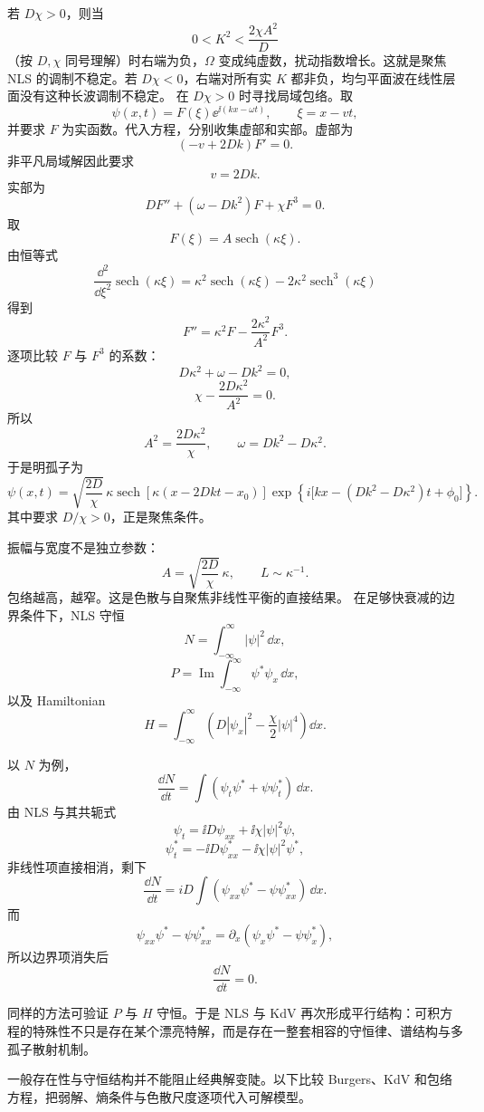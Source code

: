若 $D\chi>0$，则当
\[
0<K^2<\frac{2\chi A^2}{D}
\]
（按 $D,\chi$ 同号理解）时右端为负，$\Omega$ 变成纯虚数，扰动指数增长。这就是聚焦 NLS 的调制不稳定。若 $D\chi<0$，右端对所有实 $K$ 都非负，均匀平面波在线性层面没有这种长波调制不稳定。
在 $D\chi>0$ 时寻找局域包络。取
\[
\psi(x,t)=F(\xi)\ee^{\ii (kx-\omega t)},
\qquad
\xi=x-vt,
\]
并要求 $F$ 为实函数。代入方程，分别收集虚部和实部。虚部为
\[
(-v+2Dk)F'=0.
\]
非平凡局域解因此要求
\begin{equation*}\boxed{v=2Dk}.\end{equation*}
实部为
\[
D F''+(\omega-Dk^2)F+\chi F^3=0.
\]
取
\[
F(\xi)=A\operatorname{sech}(\kappa\xi).
\]
由恒等式
\[
\frac{\dd^2}{\dd\xi^2}\operatorname{sech}(\kappa\xi)
=\kappa^2\operatorname{sech}(\kappa\xi)
-2\kappa^2\operatorname{sech}^3(\kappa\xi)
\]
得到
\[
F''=\kappa^2F-\frac{2\kappa^2}{A^2}F^3.
\]
逐项比较 $F$ 与 $F^3$ 的系数：
\[
D\kappa^2+\omega-Dk^2=0,
\]
\[
\chi-\frac{2D\kappa^2}{A^2}=0.
\]
所以
\[
A^2=\frac{2D\kappa^2}{\chi},
\qquad
\omega=Dk^2-D\kappa^2.
\]
于是明孤子为
\begin{equation*}\boxed{
\psi(x,t)
=\sqrt{\frac{2D}{\chi}}\,\kappa
\operatorname{sech}[\kappa(x-2Dkt-x_0)]
\exp\!\left\{
i\bigl[kx-(Dk^2-D\kappa^2)t+\phi_0\bigr]
\right\}
}.\end{equation*}
其中要求 $D/\chi>0$，正是聚焦条件。

振幅与宽度不是独立参数：
\[
A=\sqrt{\frac{2D}{\chi}}\,\kappa,
\qquad
L\sim\kappa^{-1}.
\]
包络越高，越窄。这是色散与自聚焦非线性平衡的直接结果。
在足够快衰减的边界条件下，NLS 守恒
\[
N=\int_{-\infty}^{\infty}|\psi|^2\,\dd x,
\]
\[
P=\operatorname{Im}
\int_{-\infty}^{\infty}\psi^*\psi_x\,\dd x,
\]
以及 Hamiltonian
\begin{equation*}\boxed{
H=\int_{-\infty}^{\infty}
\left(
D|\psi_x|^2-\frac{\chi}{2}|\psi|^4
\right)\dd x
}.\end{equation*}

以 $N$ 为例，
\[
\frac{\dd N}{\dd t}
=\int(\psi_t\psi^*+\psi\psi_t^*)\,\dd x.
\]
由 NLS 与其共轭式
\[
\psi_t=\ii D\psi_{xx}+\ii\chi|\psi|^2\psi,
\]
\[
\psi_t^*=-\ii D\psi_{xx}^*-\ii\chi|\psi|^2\psi^*,
\]
非线性项直接相消，剩下
\[
\frac{\dd N}{\dd t}
=iD\int(\psi_{xx}\psi^*-\psi\psi_{xx}^*)\,\dd x.
\]
而
\[
\psi_{xx}\psi^*-\psi\psi_{xx}^*
=\partial_x(\psi_x\psi^*-\psi\psi_x^*),
\]
所以边界项消失后
\[
\boxed{\frac{\dd N}{\dd t}=0}.
\]

同样的方法可验证 $P$ 与 $H$ 守恒。于是 NLS 与 KdV 再次形成平行结构：可积方程的特殊性不只是存在某个漂亮特解，而是存在一整套相容的守恒律、谱结构与多孤子散射机制。


一般存在性与守恒结构并不能阻止经典解变陡。以下比较 Burgers、KdV 和包络方程，把弱解、熵条件与色散尺度逐项代入可解模型。






